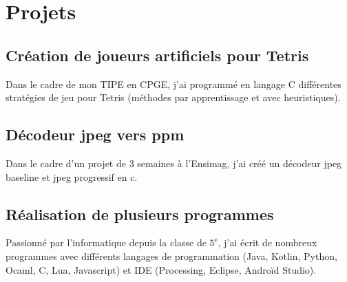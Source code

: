 \documentclass[11pt,oneside,a4paper,titlepage]{article}
\begin{document}
\vspace*{-1cm}
\section*{Projets}
\subsection*{Création de joueurs artificiels pour Tetris}
Dans le cadre de mon TIPE en CPGE, j'ai programmé en langage C différentes stratégies de jeu pour Tetris (méthodes par apprentissage et avec heuristiques).
\subsection*{Décodeur jpeg vers ppm}
Dans le cadre d'un projet de 3 semaines à l'Ensimag, j'ai créé un décodeur jpeg baseline et jpeg progressif en c.
\subsection*{Réalisation de plusieurs programmes}
Passionné par l'informatique depuis la classe de $5^{\text{e}}$, j'ai écrit de nombreux programmes avec différents langages de programmation (Java, Kotlin, Python, Ocaml, C, Lua, Javascript) et IDE (Processing, Eclipse, Androïd Studio).
\end{document}
